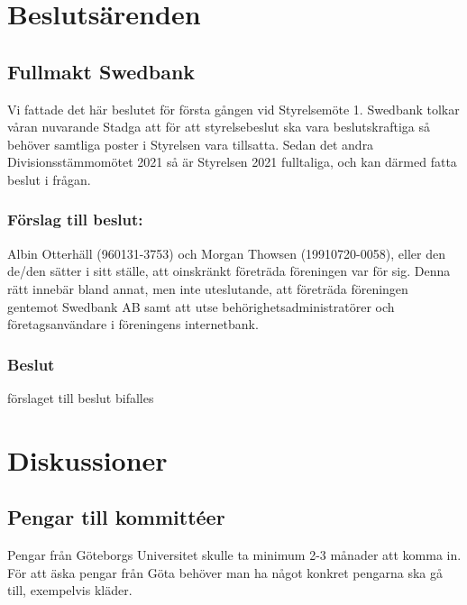 \documentclass[protokoll]{dvd}
\begin{document}
\newpage

\section{Beslutsärenden}

\subsection{Fullmakt Swedbank}

    Vi fattade det här beslutet för första gången vid Styrelsemöte 1.
    Swedbank tolkar våran nuvarande Stadga att för att styrelsebeslut ska vara beslutskraftiga så behöver samtliga poster i Styrelsen vara tillsatta.
    Sedan det andra Divisionsstämmomötet 2021 så är Styrelsen 2021 fulltaliga, och kan därmed fatta beslut i frågan.

\subsubsection*{Förslag till beslut:}
    \begin{attsatser}
        \item Albin Otterhäll (960131-3753) och Morgan Thowsen (19910720-0058), eller den de/den sätter i sitt ställe, att oinskränkt företräda föreningen var för sig. \newline Denna rätt innebär bland annat, men inte uteslutande, att företräda föreningen gentemot Swedbank AB samt att utse behörighetsadministratörer och företagsanvändare i föreningens internetbank.
    \end{attsatser}

\subsubsection*{Beslut}
    \begin{attsatser}
        \item förslaget till beslut bifalles
    \end{attsatser}


\newpage


\section{Diskussioner}\label{sec:discussioner}

\subsection{Pengar till kommittéer}
    Pengar från Göteborgs Universitet skulle ta minimum 2-3 månader att komma in.
    För att äska pengar från Göta behöver man ha något konkret pengarna ska gå till, exempelvis kläder.
\end{document}
